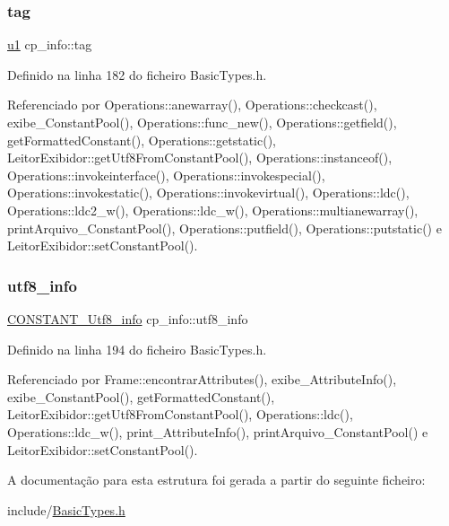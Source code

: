 \subsubsection{\texorpdfstring{tag}{tag}}
{\footnotesize\ttfamily \hyperlink{BasicTypes_8h_ad9f4cdb6757615aae2fad89dab3c5470}{u1} cp\+\_\+info\+::tag}



Definido na linha 182 do ficheiro Basic\+Types.\+h.



Referenciado por Operations\+::anewarray(), Operations\+::checkcast(), exibe\+\_\+\+Constant\+Pool(), Operations\+::func\+\_\+new(), Operations\+::getfield(), get\+Formatted\+Constant(), Operations\+::getstatic(), Leitor\+Exibidor\+::get\+Utf8\+From\+Constant\+Pool(), Operations\+::instanceof(), Operations\+::invokeinterface(), Operations\+::invokespecial(), Operations\+::invokestatic(), Operations\+::invokevirtual(), Operations\+::ldc(), Operations\+::ldc2\+\_\+w(), Operations\+::ldc\+\_\+w(), Operations\+::multianewarray(), print\+Arquivo\+\_\+\+Constant\+Pool(), Operations\+::putfield(), Operations\+::putstatic() e Leitor\+Exibidor\+::set\+Constant\+Pool().

\mbox{\label{structcp__info_a980c5cbcb2aefe984b7a4988f1f71576}} 
\subsubsection{\texorpdfstring{utf8\+\_\+info}{utf8\_info}}
{\footnotesize\ttfamily \hyperlink{structCONSTANT__Utf8__info}{C\+O\+N\+S\+T\+A\+N\+T\+\_\+\+Utf8\+\_\+info} cp\+\_\+info\+::utf8\+\_\+info}



Definido na linha 194 do ficheiro Basic\+Types.\+h.



Referenciado por Frame\+::encontrar\+Attributes(), exibe\+\_\+\+Attribute\+Info(), exibe\+\_\+\+Constant\+Pool(), get\+Formatted\+Constant(), Leitor\+Exibidor\+::get\+Utf8\+From\+Constant\+Pool(), Operations\+::ldc(), Operations\+::ldc\+\_\+w(), print\+\_\+\+Attribute\+Info(), print\+Arquivo\+\_\+\+Constant\+Pool() e Leitor\+Exibidor\+::set\+Constant\+Pool().



A documentação para esta estrutura foi gerada a partir do seguinte ficheiro\+:\begin{DoxyCompactItemize}
\item 
include/\hyperlink{BasicTypes_8h}{Basic\+Types.\+h}\end{DoxyCompactItemize}
